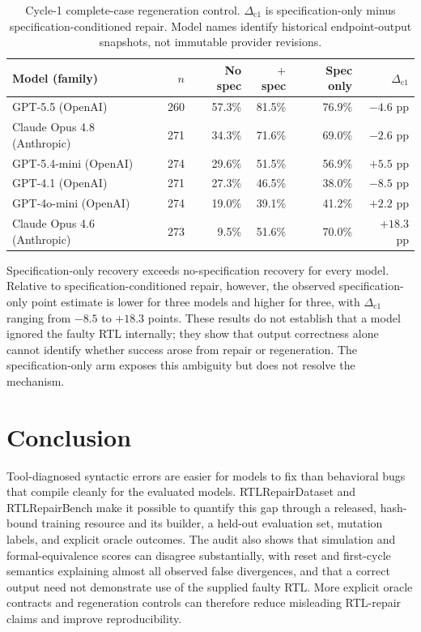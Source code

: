 \documentclass{article}
\begin{document}
\begin{table}[H]
\centering
\scriptsize
\setlength{\tabcolsep}{3.5pt}
\renewcommand{\arraystretch}{1.05}
\caption{Cycle-1 complete-case regeneration control. $\Delta_{\mathrm{c1}}$ is specification-only
minus specification-conditioned repair. Model names identify historical endpoint-output snapshots,
not immutable provider revisions.}
\label{tab:regen}
\begin{tabular}{@{}lrrrrr@{}}
\toprule
Model (family) & $n$ & No spec & $+$spec & Spec only & $\Delta_{\mathrm{c1}}$ \\
\midrule
GPT-5.5 (OpenAI) & 260 & 57.3\% & 81.5\% & 76.9\% & $-4.6$ pp \\
Claude Opus 4.8 (Anthropic) & 271 & 34.3\% & 71.6\% & 69.0\% & $-2.6$ pp \\
GPT-5.4-mini (OpenAI) & 274 & 29.6\% & 51.5\% & 56.9\% & $+5.5$ pp \\
GPT-4.1 (OpenAI) & 271 & 27.3\% & 46.5\% & 38.0\% & $-8.5$ pp \\
GPT-4o-mini (OpenAI) & 274 & 19.0\% & 39.1\% & 41.2\% & $+2.2$ pp \\
Claude Opus 4.6 (Anthropic) & 273 & 9.5\% & 51.6\% & 70.0\% & $+18.3$ pp \\
\bottomrule
\end{tabular}
\end{table}

Specification-only recovery exceeds no-specification recovery for every model. Relative to
specification-conditioned repair, however, the observed specification-only point estimate is lower
for three models and higher for three, with $\Delta_{\mathrm{c1}}$ ranging from $-8.5$ to $+18.3$
points. These results do not establish that a model ignored the faulty RTL internally; they show that
output correctness alone cannot identify whether success arose from repair or regeneration. The
specification-only arm exposes this ambiguity but does not resolve the mechanism.

\section{Conclusion}

Tool-diagnosed syntactic errors are easier for models to fix than behavioral bugs that compile
cleanly for the evaluated models. RTLRepairDataset and RTLRepairBench make it possible to quantify this
gap through a released, hash-bound training resource and its builder, a held-out evaluation
set, mutation labels, and explicit oracle outcomes. The audit
also shows that simulation and formal-equivalence scores can disagree substantially, with reset and
first-cycle semantics explaining almost all observed false divergences, and that a correct output need
not demonstrate use of the supplied faulty RTL. More explicit oracle contracts and regeneration
controls can therefore reduce misleading RTL-repair claims and improve reproducibility.
\end{document}
